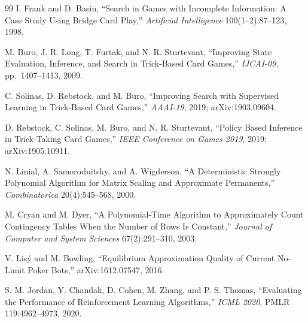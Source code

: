 \begin{thebibliography}{99}
I. Frank and D. Basin, ``Search in Games with Incomplete Information: A Case
Study Using Bridge Card Play,'' \emph{Artificial Intelligence}
100(1--2):87--123, 1998.

M. Buro, J. R. Long, T. Furtak, and N. R. Sturtevant, ``Improving State
Evaluation, Inference, and Search in Trick-Based Card Games,'' \emph{IJCAI-09},
pp.~1407--1413, 2009.

C. Solinas, D. Rebstock, and M. Buro, ``Improving Search with Supervised
Learning in Trick-Based Card Games,'' \emph{AAAI-19}, 2019; arXiv:1903.09604.

D. Rebstock, C. Solinas, M. Buro, and N. R. Sturtevant, ``Policy Based Inference
in Trick-Taking Card Games,'' \emph{IEEE Conference on Games 2019}, 2019;
arXiv:1905.10911.

N. Linial, A. Samorodnitsky, and A. Wigderson, ``A Deterministic Strongly
Polynomial Algorithm for Matrix Scaling and Approximate Permanents,''
\emph{Combinatorica} 20(4):545--568, 2000.

M. Cryan and M. Dyer, ``A Polynomial-Time Algorithm to Approximately Count
Contingency Tables When the Number of Rows Is Constant,'' \emph{Journal of
Computer and System Sciences} 67(2):291--310, 2003.

V. Lis\'y and M. Bowling, ``Equilibrium Approximation Quality of Current
No-Limit Poker Bots,'' arXiv:1612.07547, 2016.

S. M. Jordan, Y. Chandak, D. Cohen, M. Zhang, and P. S. Thomas, ``Evaluating the
Performance of Reinforcement Learning Algorithms,'' \emph{ICML 2020},
PMLR 119:4962--4973, 2020.

\end{thebibliography}
